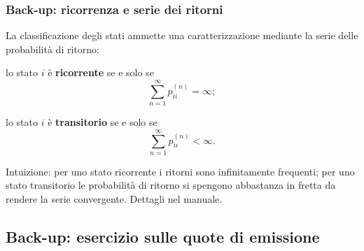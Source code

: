 \begin{frame}%
%

\frametitle{Back-up: ricorrenza e serie dei ritorni}%
%

%


La classificazione degli stati ammette una caratterizzazione mediante la serie
delle probabilit\`{a} di ritorno:

\begin{stepitemize}
\item lo stato $i$ \`{e} \textbf{ricorrente} se e solo se
\[
\sum_{n=1}^{\infty}p_{ii}^{(n)}=\infty;
\]


\item lo stato $i$ \`{e} \textbf{transitorio} se e solo se
\[
\sum_{n=1}^{\infty}p_{ii}^{(n)}<\infty.
\]

\end{stepitemize}

\medskip

\begin{center}
{\small Intuizione: per uno stato ricorrente i ritorni sono infinitamente
frequenti; per uno stato transitorio le probabilit\`{a} di ritorno si spengono
abbastanza in fretta da rendere la serie convergente. Dettagli nel manuale.}
\end{center}

%

\transboxout
\end{frame}%




\subsection{Back-up: esercizio sulle quote di emissione}%

